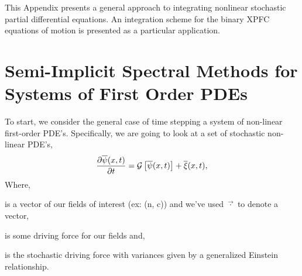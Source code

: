 \label{appendix:algorithm}

This Appendix presents  a general approach to integrating nonlinear stochastic
partial differential equations. An integration scheme for the binary
XPFC equations of motion is presented as a particular  application.

\section{Semi-Implicit Spectral Methods for Systems of First Order PDEs}  

To start, we consider the general case of time stepping  a system of non-linear
first-order PDE's. Specifically, we are going to look at a set of stochastic
non-linear PDE's,
%
\begin{equation}
	\frac{\partial \overline{\psi}(x, t)}{\partial t} = 
       \mathcal{G}\left[ \overline{\psi}(x, t) \right] + \overline{\xi}(x, t),
\end{equation} 
%
Where,
\begin{description}[align=right, labelwidth=1cm]
    \item[$\vec{\psi}(x, t)$] {is a vector of our fields of interest (ex: (n, c))
        and we've used $\vec{\cdot}$ to denote a vector,
    }
    \item[$\mathcal{G}$] is some driving force for our fields and,
    \item[$\vec{\xi}(x, t)$] { is the stochastic driving force with 
        variances given by a generalized Einstein relationship.
    }
\end{description}

